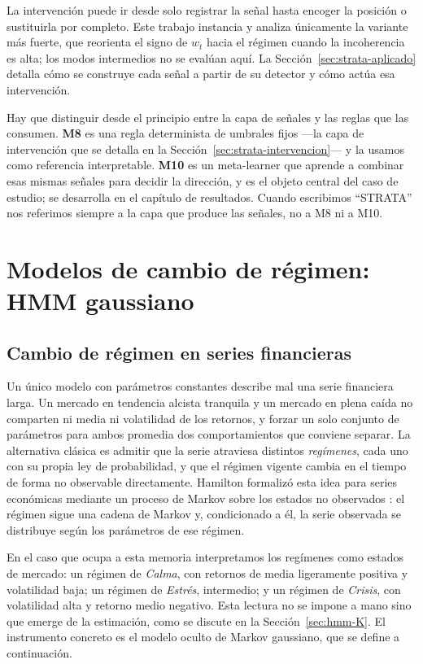 La intervención puede ir desde solo registrar la señal hasta encoger la posición o sustituirla por completo. Este trabajo instancia y analiza únicamente la variante más fuerte, que reorienta el signo de $w_t$ hacia el régimen cuando la incoherencia es alta; los modos intermedios no se evalúan aquí. La Sección~\ref{sec:strata-aplicado} detalla cómo se construye cada señal a partir de su detector y cómo actúa esa intervención.

Hay que distinguir desde el principio entre la capa de señales y las reglas que las consumen. \textbf{M8} es una regla determinista de umbrales fijos —la capa de intervención que se detalla en la Sección~\ref{sec:strata-intervencion}— y la usamos como referencia interpretable. \textbf{M10} es un meta-learner que aprende a combinar esas mismas señales para decidir la dirección, y es el objeto central del caso de estudio; se desarrolla en el capítulo de resultados. Cuando escribimos ``STRATA'' nos referimos siempre a la capa que produce las señales, no a M8 ni a M10.

\section{Modelos de cambio de régimen: HMM gaussiano}
\label{sec:hmm}

\subsection{Cambio de régimen en series financieras}
\label{sec:hmm-regimen}

Un único modelo con parámetros constantes describe mal una serie financiera larga. Un mercado en tendencia alcista tranquila y un mercado en plena caída no comparten ni media ni volatilidad de los retornos, y forzar un solo conjunto de parámetros para ambos promedia dos comportamientos que conviene separar. La alternativa clásica es admitir que la serie atraviesa distintos \emph{regímenes}, cada uno con su propia ley de probabilidad, y que el régimen vigente cambia en el tiempo de forma no observable directamente. Hamilton formalizó esta idea para series económicas mediante un proceso de Markov sobre los estados no observados \cite{hamilton1989}: el régimen sigue una cadena de Markov y, condicionado a él, la serie observada se distribuye según los parámetros de ese régimen.

En el caso que ocupa a esta memoria interpretamos los regímenes como estados de mercado: un régimen de \emph{Calma}, con retornos de media ligeramente positiva y volatilidad baja; un régimen de \emph{Estrés}, intermedio; y un régimen de \emph{Crisis}, con volatilidad alta y retorno medio negativo. Esta lectura no se impone a mano sino que emerge de la estimación, como se discute en la Sección~\ref{sec:hmm-K}. El instrumento concreto es el modelo oculto de Markov gaussiano, que se define a continuación.


